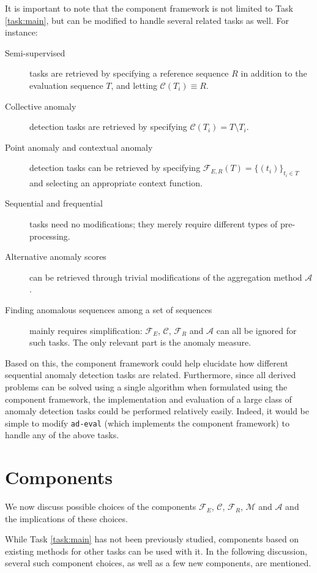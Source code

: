 It is important to note that the component framework is not limited to Task \ref{task:main}, but can be modified to handle several related tasks as well. For instance:
\begin{description}
    \item[Semi-supervised] tasks are retrieved by specifying a reference sequence $R$ in addition to the evaluation sequence $T$, and letting $\mathcal{C}(T_i) \equiv R$.
    \item[Collective anomaly] detection tasks are retrieved by specifying $\mathcal{C}(T_i) = T \setminus T_i$.
    \item[Point anomaly and contextual anomaly] detection tasks can be retrieved by specifying $\mathcal{F}_{E,R}(T) = \{(t_i)\}_{t_i \in T}$ and selecting an appropriate context function.
    \item[Sequential and frequential] tasks need no modifications; they merely require different types of pre-processing.
    \item[Alternative anomaly scores] can be retrieved through trivial modifications of the aggregation method $\mathcal{A}$.
    \item[Finding anomalous sequences among a set of sequences] mainly requires simplification: $\mathcal{F}_E$, $\mathcal{C}$, $\mathcal{F}_R$ and $\mathcal{A}$ can all be ignored for such tasks. The only relevant part is the anomaly measure.
\end{description}

Based on this, the component framework could help elucidate how different sequential anomaly detection tasks are related. Furthermore, since all derived problems can be solved using a single algorithm when formulated using the component framework, the implementation and evaluation of a large class of anomaly detection tasks could be performed relatively easily. Indeed, it would be simple to modify \texttt{ad-eval} (which implements the component framework) to handle any of the above tasks.

\section{Components}
\label{sect:deriving_problems}

We now discuss possible choices of the components $\mathcal{F}_E$, $\mathcal{C}$, $\mathcal{F}_R$, $\mathcal{M}$ and $\mathcal{A}$ and the implications of these choices.

While Task \ref{task:main} has not been previously studied, components based on existing methods for other tasks can be used with it. In the following discussion, several such component choices, as well as a few new components, are mentioned.

